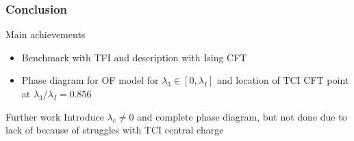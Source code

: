 \documentclass[10pt]{beamer}
\begin{document}
\begin{frame}
    \frametitle{Conclusion}

    \begin{block}{Main achievements}
        \begin{itemize}
            \item Benchmark with TFI and description with Ising CFT
            \pause
            \item Phase diagram for OF model for $\lambda_3 \in [0, \lambda_I]$ and location of TCI CFT point at $\lambda_3/\lambda_I = 0.856$
        \end{itemize}
    \end{block}

    \pause
    \begin{block}{Further work}
        Introduce $\lambda_c \neq 0$ and complete phase diagram, but not done due to lack of because of struggles with TCI central charge
    \end{block}






\end{frame}
\end{document}
